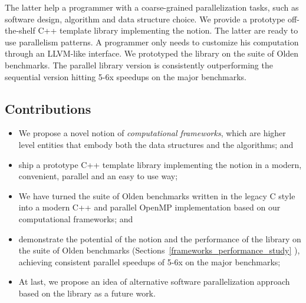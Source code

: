 The latter help a programmer with a coarse-grained parallelization tasks, such as software design, algorithm and data structure choice. We provide a prototype off-the-shelf C++ template library implementing the notion. The latter are ready to use parallelism patterns. A programmer only needs to customize his computation through an LLVM-like interface. We prototyped the library on the suite of Olden benchmarks. The parallel library version is consistently outperforming the sequential version hitting 5-6x speedups on the major benchmarks.


\subsection{Contributions}
\begin{itemize}[style=unboxed,leftmargin=0cm]
\itemsep0em
\renewcommand\labelitemi{$\vartriangleright$}
\renewcommand\labelitemii{$\bullet$}
\item We propose a novel notion of \textit{computational frameworks}, which are higher level entities that embody both the data structures and the algorithms; and
\item ship a prototype C++ template library implementing the notion in a modern, convenient, parallel and an easy to use way;
\item We have turned the suite of Olden benchmarks written in the legacy C style into a modern C++ and parallel OpenMP implementation based on our computational frameworks; and
\item demonstrate the potential of the notion and the performance of the library on the suite of Olden benchmarks (Sections~\ref{frameworks_performance_study} ), achieving consistent parallel speedups of 5-6x on the major benchmarks;
\item At last, we propose an idea of alternative software parallelization approach based on the library as a future work.
\end{itemize}

%